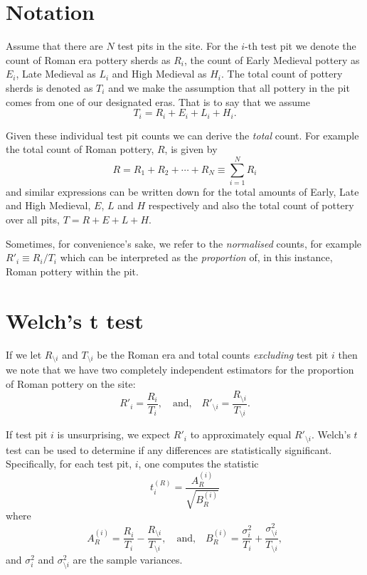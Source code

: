\documentclass[conference]{IEEEtran}
\begin{document}
\section{Notation}

Assume that there are $N$ test pits in the site. For the $i$-th test pit we
denote the count of Roman era pottery sherds as $R_i$, the count of Early
Medieval pottery as $E_i$, Late Medieval as $L_i$ and High Medieval as $H_i$.
The total count of pottery sherds is denoted as $T_i$ and we make the assumption
that all pottery in the pit comes from one of our designated eras. That is to
say that we assume
\[
    T_i = R_i + E_i + L_i + H_i.
\]

Given these individual test pit counts we can derive the \emph{total} count.
For example the total count of Roman pottery, $R$, is given by
\[
    R = R_1 + R_2 + \cdots + R_N \equiv \sum_{i=1}^N R_i
\]
and similar expressions can be written down for the total amounts of Early, Late
and High Medieval, $E$, $L$ and $H$ respectively and also the total count of
pottery over all pits, $T = R + E + L + H$.

Sometimes, for convenience's sake, we refer to the \emph{normalised} counts,
for example $R'_i \equiv R_i / T_i$ which can be interpreted as the
\emph{proportion} of, in this instance, Roman pottery within the pit.

\section{Welch's t test}

If we let $R_{\setminus i}$ and $T_{\setminus i}$ be the Roman era and total
counts \emph{excluding} test pit $i$ then we note that we have two completely
independent estimators for the proportion of Roman pottery on the site:
\[
    R'_i = \frac{R_i}{T_i}, \quad \mbox{and,} \quad
    R'_{\setminus i} = \frac{R_{\setminus i}}{T_{\setminus i}}.
\]

If test pit $i$ is unsurprising, we expect $R'_i$ to approximately equal
$R'_{\setminus i}$. Welch's $t$ test\cite{welch} can be used to determine if any
differences are statistically significant. Specifically, for each test pit, $i$,
one computes the statistic
\[
    t^{(R)}_i = \frac{A^{(i)}_R}{\sqrt{B^{(i)}_R}}
\]
where
\[
    A^{(i)}_R = \frac{R_i}{T_i} - \frac{R_{\setminus i}}{T_{\setminus i}},
    \quad\mbox{and,}\quad
    B^{(i)}_R = \frac{\sigma^2_i}{T_i} +
    \frac{\sigma^2_{\setminus i}}{T_{\setminus i}},
\]
and $\sigma^2_i$ and $\sigma^2_{\setminus i}$ are the sample variances.
\end{document}
